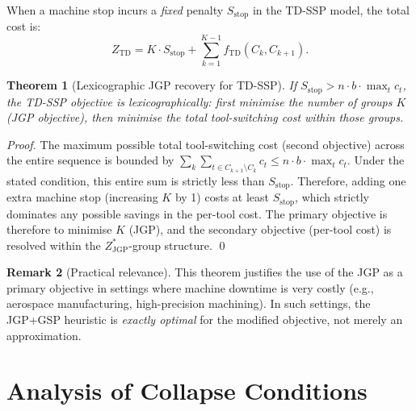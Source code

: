 \documentclass[11pt,a4paper]{article}
\theoremstyle{plain}
\newtheorem{theorem}{Theorem}[section]
\theoremstyle{definition}
\newtheorem{remark}[theorem]{Remark}
\newcommand{\ZJGP}{Z_{\mathrm{JGP}}^*}
\begin{document}
When a machine stop incurs a \emph{fixed} penalty $S_\mathrm{stop}$ in the
TD-SSP model, the total cost is:
\[
  Z_\mathrm{TD} = K \cdot S_\mathrm{stop} + \sum_{k=1}^{K-1} f_\mathrm{TD}(C_k, C_{k+1}).
\]

\begin{thmbox}
\begin{theorem}[Lexicographic JGP recovery for TD-SSP]
\label{thm:lexico}
If $S_\mathrm{stop} > n \cdot b \cdot \max_t c_t$, the TD-SSP objective is
\emph{lexicographically}: first minimise the number of groups $K$ (JGP objective),
then minimise the total tool-switching cost within those groups.
\end{theorem}
\end{thmbox}

\begin{proofbox}
\begin{proof}
The maximum possible total tool-switching cost (second objective) across the
entire sequence is bounded by $\sum_k \sum_{t \in C_{k+1} \setminus C_k} c_t
\le n \cdot b \cdot \max_t c_t$. Under the stated condition, this entire sum is
strictly less than $S_\mathrm{stop}$. Therefore, adding one extra machine stop
(increasing $K$ by 1) costs at least $S_\mathrm{stop}$, which strictly dominates
any possible savings in the per-tool cost. The primary objective is therefore to
minimise $K$ (JGP), and the secondary objective (per-tool cost) is resolved within
the $\ZJGP$-group structure. \qed
\end{proof}
\end{proofbox}

\begin{remark}[Practical relevance]
This theorem justifies the use of the JGP as a primary objective in settings
where machine downtime is very costly (e.g., aerospace manufacturing, high-precision
machining). In such settings, the JGP+GSP heuristic is \emph{exactly optimal} for
the modified objective, not merely an approximation.
\end{remark}

\section{Analysis of Collapse Conditions}
\label{sec:analysis}
\end{document}
